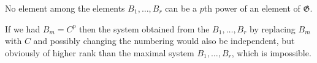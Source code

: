 No element among the elements $B_1, \ldots, B_r$ can be a $p$th power of an element of $\mathfrak{G}$.

If we had $B_m = C^p$ then the system obtained from the $B_1, \ldots, B_r$ by replacing $B_m$ with $C$ and possibly changing the numbering would also be independent, but obviously of higher rank than the maximal system $B_1, \ldots, B_r$, which is impossible.

